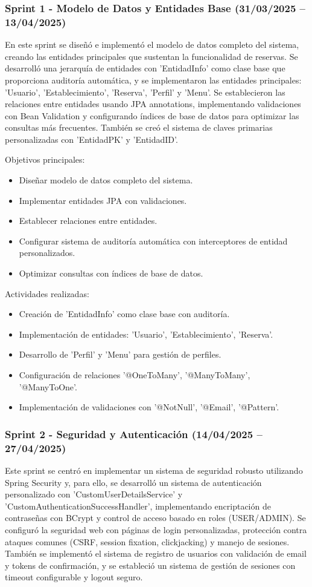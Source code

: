 \subsubsection{Sprint 1 - Modelo de Datos y Entidades Base (31/03/2025 – 13/04/2025)} 
En este sprint se diseñó e implementó el modelo de datos completo del sistema, creando las entidades principales que sustentan la funcionalidad de reservas. Se desarrolló una jerarquía de entidades con 'EntidadInfo' como clase base que proporciona auditoría automática, y se implementaron las entidades principales: 'Usuario', 'Establecimiento', 'Reserva', 'Perfil' y 'Menu'. Se establecieron las relaciones entre entidades usando JPA annotations, implementando validaciones con Bean Validation y configurando índices de base de datos para optimizar las consultas más frecuentes. También se creó el sistema de claves primarias personalizadas con 'EntidadPK' y 'EntidadID'.

Objetivos principales:
\begin{itemize}
\tightlist
\item
Diseñar modelo de datos completo del sistema.
\item
Implementar entidades JPA con validaciones.
\item
Establecer relaciones entre entidades.
\item
Configurar sistema de auditoría automática con interceptores de entidad personalizados.
\item
Optimizar consultas con índices de base de datos.
\end{itemize}

Actividades realizadas:
\begin{itemize}
\tightlist
\item
Creación de 'EntidadInfo' como clase base con auditoría.
\item
Implementación de entidades: 'Usuario', 'Establecimiento', 'Reserva'.
\item
Desarrollo de 'Perfil' y 'Menu' para gestión de perfiles.
\item
Configuración de relaciones '@OneToMany', '@ManyToMany', '@ManyToOne'.
\item
Implementación de validaciones con '@NotNull', '@Email', '@Pattern'.
\end{itemize}

\subsubsection{Sprint 2 - Seguridad y Autenticación (14/04/2025 – 27/04/2025)} 
Este sprint se centró en implementar un sistema de seguridad robusto utilizando Spring Security y, para ello, se desarrolló un sistema de autenticación personalizado con 'CustomUserDetailsService' y 'CustomAuthenticationSuccessHandler', implementando encriptación de contraseñas con BCrypt y control de acceso basado en roles (USER/ADMIN). Se configuró la seguridad web con páginas de login personalizadas, protección contra ataques comunes (CSRF, session fixation, clickjacking) y manejo de sesiones. También se implementó el sistema de registro de usuarios con validación de email y tokens de confirmación, y se estableció un sistema de gestión de sesiones con timeout configurable y logout seguro.

